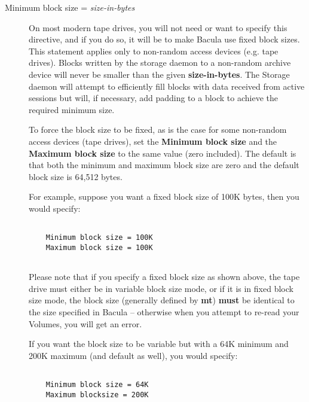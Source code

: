 \begin{description}
\item [Minimum block size = {\it size-in-bytes}]
   On most modern tape drives, you will not need or want to specify this
   directive, and if you do so, it will be to make Bacula use fixed block
   sizes.  This statement applies only to non-random access devices (e.g.
   tape drives).  Blocks written by the storage daemon to a non-random
   archive device will never be smaller than the given {\bf size-in-bytes}.
   The Storage daemon will attempt to efficiently fill blocks with data
   received from active sessions but will, if necessary, add padding to a
   block to achieve the required minimum size.
   
   To force the block size to be fixed, as is the case for some non-random
   access devices (tape drives), set the {\bf Minimum block size} and the
   {\bf Maximum block size} to the same value (zero included).  The default
   is that both the minimum and maximum block size are zero and the default
   block size is 64,512 bytes. 
   
   For  example, suppose you want a fixed block size of 100K bytes, then you 
   would specify:  

\footnotesize
\begin{verbatim}
 
    Minimum block size = 100K
    Maximum block size = 100K
    
\end{verbatim}
\normalsize

   Please note that if you specify a fixed block size as shown above,  the tape
   drive must either be in variable block size mode, or  if it is in fixed block
   size mode, the block size (generally  defined by {\bf mt}) {\bf must} be
   identical to the size specified  in Bacula -- otherwise when you attempt to
   re-read your Volumes,  you will get an error.  
   
   If you want the  block size to be variable but with a 64K minimum and 200K
   maximum (and  default as well), you would specify:  

\footnotesize
\begin{verbatim}
 
    Minimum block size = 64K
    Maximum blocksize = 200K
   
\end{verbatim}
\normalsize


\end{description}
